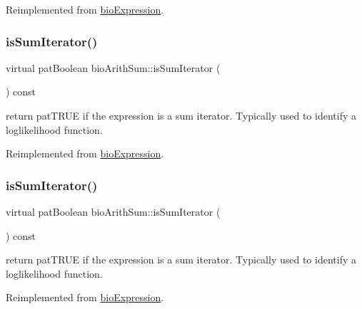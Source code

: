 Reimplemented from \hyperlink{classbio_expression_aee422b6c10811d2478972c83300acbb0}{bio\+Expression}.

\mbox{\label{classbio_arith_sum_ab0747dc4d0f4fbe2cb246b265ec3cd11}} 
\subsubsection{\texorpdfstring{is\+Sum\+Iterator()}{isSumIterator()}\hspace{0.1cm}{\footnotesize\ttfamily [3/4]}}
{\footnotesize\ttfamily virtual pat\+Boolean bio\+Arith\+Sum\+::is\+Sum\+Iterator (\begin{DoxyParamCaption}{ }\end{DoxyParamCaption}) const\hspace{0.3cm}{\ttfamily [virtual]}}

return pat\+T\+R\+UE if the expression is a sum iterator. Typically used to identify a loglikelihood function. 

Reimplemented from \hyperlink{classbio_expression_aee422b6c10811d2478972c83300acbb0}{bio\+Expression}.

\mbox{\label{classbio_arith_sum_ab0747dc4d0f4fbe2cb246b265ec3cd11}} 
\subsubsection{\texorpdfstring{is\+Sum\+Iterator()}{isSumIterator()}\hspace{0.1cm}{\footnotesize\ttfamily [4/4]}}
{\footnotesize\ttfamily virtual pat\+Boolean bio\+Arith\+Sum\+::is\+Sum\+Iterator (\begin{DoxyParamCaption}{ }\end{DoxyParamCaption}) const\hspace{0.3cm}{\ttfamily [virtual]}}

return pat\+T\+R\+UE if the expression is a sum iterator. Typically used to identify a loglikelihood function. 

Reimplemented from \hyperlink{classbio_expression_aee422b6c10811d2478972c83300acbb0}{bio\+Expression}.



